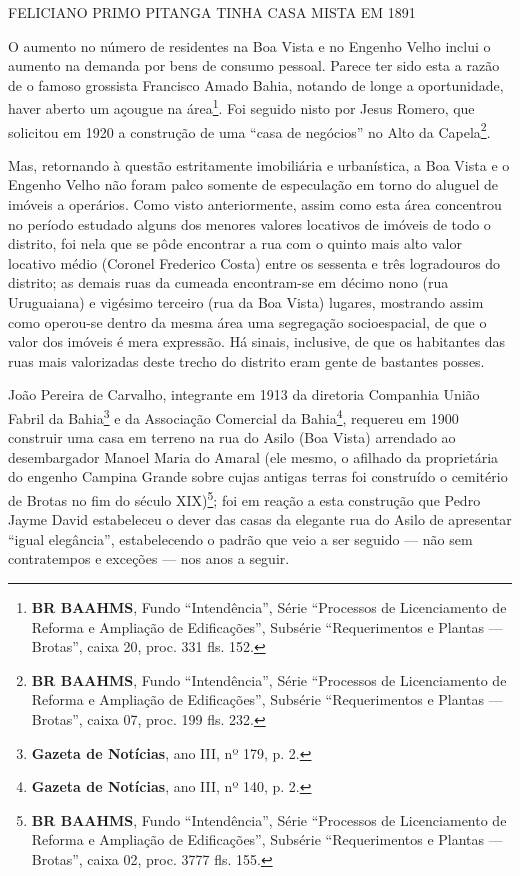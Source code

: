 FELICIANO PRIMO PITANGA TINHA CASA MISTA EM 1891

O aumento no número de residentes na Boa Vista e no Engenho Velho inclui o aumento na demanda por bens de consumo pessoal. Parece ter sido esta a razão de o famoso grossista Francisco Amado Bahia, notando de longe a oportunidade, haver aberto um açougue na área\footnote{\textbf{BR BAAHMS}, Fundo ``Intendência'', Série ``Processos de Licenciamento de Reforma e Ampliação de Edificações'', Subsérie ``Requerimentos e Plantas --- Brotas'', caixa 20, proc. 331 fls. 152.}. Foi seguido nisto por Jesus Romero, que solicitou em 1920 a construção de uma ``casa de negócios'' no Alto da Capela\footnote{\textbf{BR BAAHMS}, Fundo ``Intendência'', Série ``Processos de Licenciamento de Reforma e Ampliação de Edificações'', Subsérie ``Requerimentos e Plantas --- Brotas'', caixa 07, proc. 199 fls. 232.}. 


Mas, retornando à questão estritamente imobiliária e urbanística, a Boa Vista e o Engenho Velho não foram palco somente de especulação em torno do aluguel de imóveis a operários. Como visto anteriormente, assim como esta área concentrou no período estudado alguns dos menores valores locativos de imóveis de todo o distrito, foi nela que se pôde encontrar a rua com o quinto mais alto valor locativo médio (Coronel Frederico Costa) entre os sessenta e três logradouros do distrito; as demais ruas da cumeada encontram-se em décimo nono (rua Uruguaiana) e vigésimo terceiro (rua da Boa Vista) lugares, mostrando assim como operou-se dentro da mesma área uma segregação socioespacial, de que o valor dos imóveis é mera expressão. Há sinais, inclusive, de que os habitantes das ruas mais valorizadas deste trecho do distrito eram gente de bastantes posses.

João Pereira de Carvalho, integrante em 1913 da diretoria Companhia União Fabril da Bahia\footnote{\textbf{Gazeta de Notícias}, ano III, nº 179, p. 2.} e da Associação Comercial da Bahia\footnote{\textbf{Gazeta de Notícias}, ano III, nº 140, p. 2.}, requereu em 1900 construir uma casa em terreno na rua do Asilo (Boa Vista) arrendado ao desembargador Manoel Maria do Amaral (ele mesmo, o afilhado da proprietária do engenho Campina Grande sobre cujas antigas terras foi construído o cemitério de Brotas no fim do século XIX)\footnote{\textbf{BR BAAHMS}, Fundo ``Intendência'', Série ``Processos de Licenciamento de Reforma e Ampliação de Edificações'', Subsérie ``Requerimentos e Plantas --- Brotas'', caixa 02, proc. 3777 fls. 155.}; foi em reação a esta construção que Pedro Jayme David estabeleceu o dever das casas da elegante rua do Asilo de apresentar ``igual elegância'', estabelecendo o padrão que veio a ser seguido --- não sem contratempos e exceções --- nos anos a seguir.

